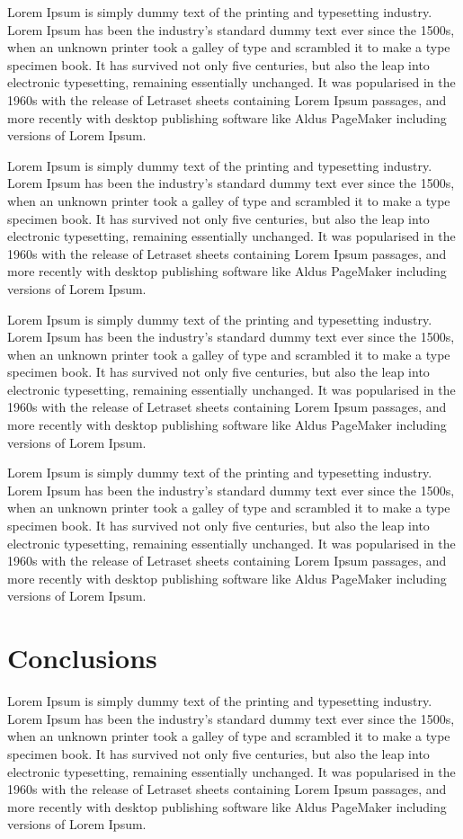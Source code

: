 \documentclass[conference]{IEEEtran}
\begin{document}
Lorem Ipsum is simply dummy text of the printing and typesetting industry. Lorem Ipsum has been the industry's standard dummy text ever since the 1500s, when an unknown printer took a galley of type and scrambled it to make a type specimen book. It has survived not only five centuries, but also the leap into electronic typesetting, remaining essentially unchanged. It was popularised in the 1960s with the release of Letraset sheets containing Lorem Ipsum passages, and more recently with desktop publishing software like Aldus PageMaker including versions of Lorem Ipsum.

Lorem Ipsum is simply dummy text of the printing and typesetting industry. Lorem Ipsum has been the industry's standard dummy text ever since the 1500s, when an unknown printer took a galley of type and scrambled it to make a type specimen book. It has survived not only five centuries, but also the leap into electronic typesetting, remaining essentially unchanged. It was popularised in the 1960s with the release of Letraset sheets containing Lorem Ipsum passages, and more recently with desktop publishing software like Aldus PageMaker including versions of Lorem Ipsum.

Lorem Ipsum is simply dummy text of the printing and typesetting industry. Lorem Ipsum has been the industry's standard dummy text ever since the 1500s, when an unknown printer took a galley of type and scrambled it to make a type specimen book. It has survived not only five centuries, but also the leap into electronic typesetting, remaining essentially unchanged. It was popularised in the 1960s with the release of Letraset sheets containing Lorem Ipsum passages, and more recently with desktop publishing software like Aldus PageMaker including versions of Lorem Ipsum.

Lorem Ipsum is simply dummy text of the printing and typesetting industry. Lorem Ipsum has been the industry's standard dummy text ever since the 1500s, when an unknown printer took a galley of type and scrambled it to make a type specimen book. It has survived not only five centuries, but also the leap into electronic typesetting, remaining essentially unchanged. It was popularised in the 1960s with the release of Letraset sheets containing Lorem Ipsum passages, and more recently with desktop publishing software like Aldus PageMaker including versions of Lorem Ipsum.

\section{Conclusions}
Lorem Ipsum is simply dummy text of the printing and typesetting industry. Lorem Ipsum has been the industry's standard dummy text ever since the 1500s, when an unknown printer took a galley of type and scrambled it to make a type specimen book. It has survived not only five centuries, but also the leap into electronic typesetting, remaining essentially unchanged. It was popularised in the 1960s with the release of Letraset sheets containing Lorem Ipsum passages, and more recently with desktop publishing software like Aldus PageMaker including versions of Lorem Ipsum.
\end{document}
